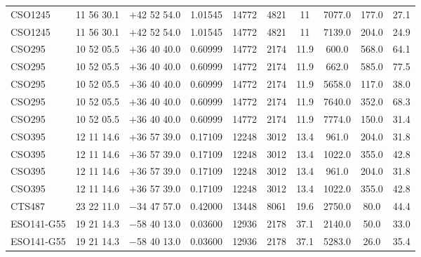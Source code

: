 \begin{landscape}
\begin{center}
\begin{longtable}{l c c c c c c c c c}
CSO1245  &                 11 56 30.1  &         $+$42 52 54.0  &       1.01545  & 14772  &   4821  &       11  &        7077.0  &  177.0  &  27.1  \\
CSO1245  &                 11 56 30.1  &         $+$42 52 54.0  &       1.01545  & 14772  &   4821  &       11  &        7139.0  &  204.0  &  24.9  \\
CSO295  &                  10 52 05.5  &         $+$36 40 40.0  &       0.60999  & 14772  &   2174  &       11.9  &      600.0  &   568.0  &  64.1  \\
CSO295  &                  10 52 05.5  &         $+$36 40 40.0  &       0.60999  & 14772  &   2174  &       11.9  &      662.0  &   585.0  &  77.5  \\
CSO295  &                  10 52 05.5  &         $+$36 40 40.0  &       0.60999  & 14772  &   2174  &       11.9  &      5658.0  &  117.0  &  38.0  \\
CSO295  &                  10 52 05.5  &         $+$36 40 40.0  &       0.60999  & 14772  &   2174  &       11.9  &      7640.0  &  352.0  &  68.3  \\
CSO295  &                  10 52 05.5  &         $+$36 40 40.0  &       0.60999  & 14772  &   2174  &       11.9  &      7774.0  &  150.0  &  31.4  \\
CSO395  &                  12 11 14.6  &         $+$36 57 39.0  &       0.17109  & 12248  &   3012  &       13.4  &      961.0  &   204.0  &  31.8  \\
CSO395  &                  12 11 14.6  &         $+$36 57 39.0  &       0.17109  & 12248  &   3012  &       13.4  &      1022.0  &  355.0  &  42.8  \\
CSO395  &                  12 11 14.6  &         $+$36 57 39.0  &       0.17109  & 12248  &   3012  &       13.4  &      961.0  &   204.0  &  31.8  \\
CSO395  &                  12 11 14.6  &         $+$36 57 39.0  &       0.17109  & 12248  &   3012  &       13.4  &      1022.0  &  355.0  &  42.8  \\
CTS487  &                  23 22 11.0  &         $-$34 47 57.0  &       0.42000  & 13448  &   8061  &       19.6  &      2750.0  &  80.0  &   44.4  \\
ESO141-G55  &              19 21 14.3  &         $-$58 40 13.0  &       0.03600  & 12936  &   2178  &       37.1  &      2140.0  &  50.0  &   33.0  \\
ESO141-G55  &              19 21 14.3  &         $-$58 40 13.0  &       0.03600  & 12936  &   2178  &       37.1  &      5283.0  &  26.0  &   35.4  \\

\end{longtable}
\end{center}
\end{landscape}
